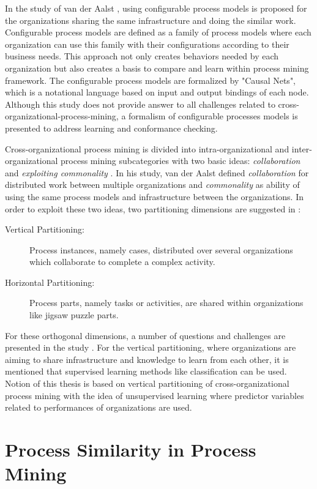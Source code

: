 In the study of van der Aalst \cite{van2011business}, using configurable process models is proposed for the organizations sharing the same infrastructure and doing the similar work. Configurable process models are defined as a family of process models where each organization can use this family with their configurations according to their business needs. This approach not only creates behaviors needed by each organization but also creates a basis to compare and learn within process mining framework. The configurable process models are formalized by "Causal Nets", which is a notational language based on input and output bindings of each node. Although this study does not provide answer to all challenges related to cross-organizational-process-mining, a formalism of configurable processes models is presented to address learning and conformance checking.

Cross-organizational process mining is divided into intra-organizational and inter-organizational process mining subcategories with two basic ideas: \textit{collaboration} and \textit{exploiting commonality} \cite{van2011intra}. In his study, van der Aalst defined \textit{collaboration} for distributed work between multiple organizations and \textit{commonality} as ability of using the same process models and infrastructure between the organizations. In order to exploit these two ideas, two partitioning dimensions are suggested in \cite{van2011intra}:
\begin{description}
\item[Vertical Partitioning:] Process instances, namely cases, distributed over several organizations which collaborate to complete a complex activity. 
\item[Horizontal Partitioning:] Process parts, namely tasks or activities, are shared within organizations like jigsaw puzzle parts.
\end{description}
For these orthogonal dimensions, a number of questions and challenges are presented in the study  \cite{van2011intra}. For the vertical partitioning, where organizations are aiming to share infrastructure and knowledge to learn from each other, it is mentioned that supervised learning methods like classification can be used. Notion of this thesis is based on vertical partitioning of cross-organizational process mining with the idea of unsupervised learning where predictor variables related to performances of organizations are used.
 
\section{Process Similarity in Process Mining}
\label{sec:process-similarity-in-process-mining}

